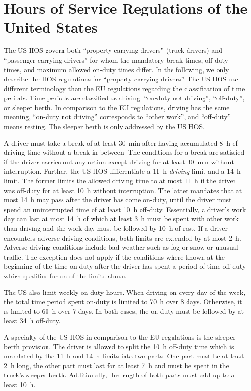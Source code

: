 \section{Hours of Service Regulations of the United States\label{sec:hos_us}}
The US HOS \cite{federalmotorcarriersafetyadministrationfmcsa:2011} govern both ``property-carrying drivers'' (truck drivers) and ``passenger-carrying drivers'' for whom the mandatory break times, off-duty times, and maximum allowed on-duty times differ. In the following, we only describe the HOS regulations for ``property-carrying drivers''. The US HOS use different terminology than the EU regulations regarding the classification of time periods. Time periods are classified as driving, ``on-duty not driving'', ``off-duty'', or sleeper berth. In comparison to the EU regulations, driving has the same meaning, ``on-duty not driving'' corresponds to ``other work'', and ``off-duty'' means resting. The sleeper berth is only addressed by the US HOS.

A driver must take a break of at least \SI{30}{\minute} after having accumulated \SI{8}{\hour} of driving time without a break in between. The conditions for a break are satisfied if the driver carries out any action except driving for at least \SI{30}{\minute} without interruption. Further, the US HOS differentiate a \SI{11}{\hour} \emph{driving} limit and a \SI{14}{\hour} limit. The former limits the allowed driving time to at most \SI{11}{\hour} if the driver was off-duty for at least \SI{10}{\hour} without interruption. The latter mandates that at most \SI{14}{\hour} may pass after the driver has come on-duty, until the driver must spend an uninterrupted time of at least \SI{10}{\hour} off-duty. Essentially, a driver's work day can last at most \SI{14}{\hour} of which at least \SI{3}{\hour} must be spent with other work than driving and the work day must be followed by \SI{10}{\hour} of rest. If a driver encounters adverse driving conditions, both limits are extended by at most \SI{2}{\hour}. Adverse driving conditions include bad weather such as fog or snow or unusual traffic. The exception does not apply if the conditions where known at the beginning of the time on-duty after the driver has spent a period of time off-duty which qualifies for on of the limits above.

The US also limit weekly on-duty hours. When driving on every day of the week, the total time period spent on-duty is limited to \SI{70}{\hour} over 8 days. Otherwise, it is limited to \SI{60}{\hour} over 7 days. In both cases, the on-duty must be followed by at least \SI{34}{\hour} off-duty.

A specialty of the US HOS in comparison to the EU regulations is the sleeper berth provision. The driver is allowed to split the \SI{10}{\hour} off-duty time which is mandated by the \SI{11}{\hour} and \SI{14}{\hour} limits into two parts. One part must be at least \SI{2}{\hour} long, the other part must last for at least \SI{7}{\hour} and must be spent in the truck's sleeper berth. Additionally, the length of both parts must add up to at least \SI{10}{\hour}.

